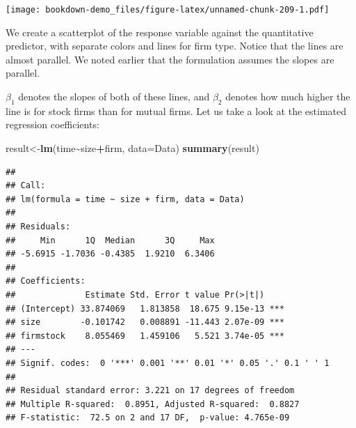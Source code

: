 \documentclass[
]{book}
\newenvironment{Shaded}{\begin{snugshade}}{\end{snugshade}}
\newcommand{\AttributeTok}[1]{\textcolor[rgb]{0.13,0.29,0.53}{#1}}
\newcommand{\ConstantTok}[1]{\textcolor[rgb]{0.56,0.35,0.01}{#1}}
\newcommand{\DocumentationTok}[1]{\textcolor[rgb]{0.56,0.35,0.01}{\textbf{\textit{#1}}}}
\newcommand{\FunctionTok}[1]{\textcolor[rgb]{0.13,0.29,0.53}{\textbf{#1}}}
\newcommand{\NormalTok}[1]{#1}
\newcommand{\OtherTok}[1]{\textcolor[rgb]{0.56,0.35,0.01}{#1}}
\newcommand{\SpecialCharTok}[1]{\textcolor[rgb]{0.81,0.36,0.00}{\textbf{#1}}}
\newcommand{\StringTok}[1]{\textcolor[rgb]{0.31,0.60,0.02}{#1}}
\begin{document}
\begin{Shaded}
\end{Shaded}

\texttt{[image: bookdown-demo\_files/figure-latex/unnamed-chunk-209-1.pdf]}

We create a scatterplot of the response variable against the quantitative predictor, with separate colors and lines for firm type. Notice that the lines are almost parallel. We noted earlier that the formulation assumes the slopes are parallel.

\(\beta_1\) denotes the slopes of both of these lines, and \(\beta_2\) denotes how much higher the line is for stock firms than for mutual firms. Let us take a look at the estimated regression coefficients:

\begin{Shaded}
\begin{Highlighting}[]
\NormalTok{result}\OtherTok{\textless{}{-}}\FunctionTok{lm}\NormalTok{(time}\SpecialCharTok{\textasciitilde{}}\NormalTok{size}\SpecialCharTok{+}\NormalTok{firm, }\AttributeTok{data=}\NormalTok{Data)}
\FunctionTok{summary}\NormalTok{(result)}
\end{Highlighting}
\end{Shaded}

\begin{verbatim}
## 
## Call:
## lm(formula = time ~ size + firm, data = Data)
## 
## Residuals:
##     Min      1Q  Median      3Q     Max 
## -5.6915 -1.7036 -0.4385  1.9210  6.3406 
## 
## Coefficients:
##              Estimate Std. Error t value Pr(>|t|)    
## (Intercept) 33.874069   1.813858  18.675 9.15e-13 ***
## size        -0.101742   0.008891 -11.443 2.07e-09 ***
## firmstock    8.055469   1.459106   5.521 3.74e-05 ***
## ---
## Signif. codes:  0 '***' 0.001 '**' 0.01 '*' 0.05 '.' 0.1 ' ' 1
## 
## Residual standard error: 3.221 on 17 degrees of freedom
## Multiple R-squared:  0.8951, Adjusted R-squared:  0.8827 
## F-statistic:  72.5 on 2 and 17 DF,  p-value: 4.765e-09
\end{verbatim}
\end{document}
